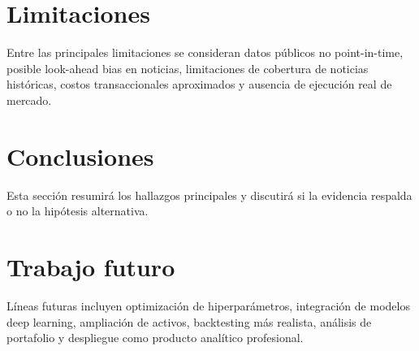 \documentclass[12pt,a4paper]{article}
\begin{document}
\section{Limitaciones}

Entre las principales limitaciones se consideran datos públicos no point-in-time, posible look-ahead bias en noticias, limitaciones de cobertura de noticias históricas, costos transaccionales aproximados y ausencia de ejecución real de mercado.

\section{Conclusiones}

Esta sección resumirá los hallazgos principales y discutirá si la evidencia respalda o no la hipótesis alternativa.

\section{Trabajo futuro}

Líneas futuras incluyen optimización de hiperparámetros, integración de modelos deep learning, ampliación de activos, backtesting más realista, análisis de portafolio y despliegue como producto analítico profesional.

\newpage

\printbibliography
\end{document}
